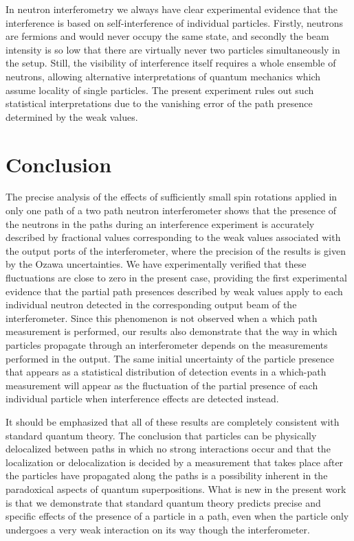 \documentclass[english,keywords,aps,twocolumn]{revtex4-1}
\begin{document}
In neutron interferometry we always have clear experimental evidence that the interference is based on self-interference of individual particles. Firstly, neutrons are fermions and would never occupy the same state, and secondly the beam intensity is so low that there are virtually never two particles simultaneously in the setup. Still, the visibility of interference itself requires a whole ensemble of neutrons, allowing alternative interpretations of quantum mechanics which assume locality of single particles. The present experiment rules out such statistical interpretations due to the vanishing error of the path presence determined by the weak values. 


\section{Conclusion}

The precise analysis of the effects of sufficiently small spin rotations applied in only one path of a two path neutron interferometer shows that the presence of the neutrons in the paths during an interference experiment is accurately described by fractional values corresponding to the weak values associated with the output ports of the interferometer, where the precision of the results is given by the Ozawa uncertainties. 
We have experimentally verified that these fluctuations are close to zero in the present case, providing the first experimental evidence that the partial path presences described by weak values apply to each individual neutron detected in the corresponding output beam of the interferometer. Since this phenomenon is not observed when a which path measurement is performed, our results also demonstrate that the way in which particles propagate through an interferometer depends on the measurements performed in the output. The same initial uncertainty of the particle presence that appears as a statistical distribution of detection events in a which-path measurement will appear as the fluctuation of the partial presence of each individual particle when interference effects are detected instead.

It should be emphasized that all of these results are completely consistent with standard quantum theory. The conclusion that particles can be physically delocalized between paths in which no strong interactions occur and that the localization or delocalization is decided by a measurement that takes place after the particles have propagated along the paths is a possibility inherent in the paradoxical aspects of quantum superpositions. What is new in the present work is that we demonstrate that standard quantum theory predicts precise and specific effects of the presence of a particle in a path, even when the particle only undergoes a very weak interaction on its way though the interferometer.
\end{document}
